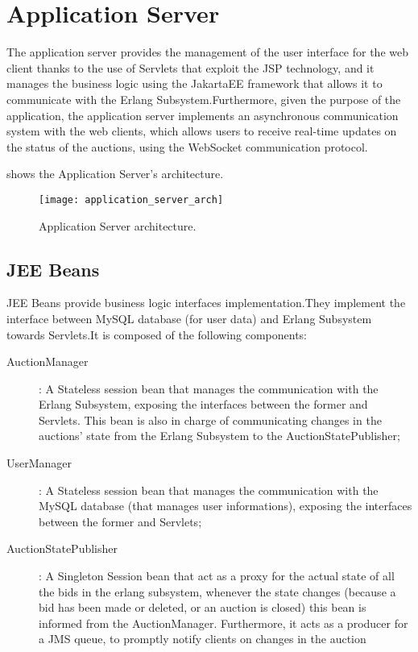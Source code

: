 \section{Application Server}\label{sec:application_server}
The application server provides the management of the user interface for the web
client thanks to the use of Servlets that exploit the JSP technology, and it
manages the business logic using the JakartaEE framework that allows it to
communicate with the Erlang Subsystem.Furthermore, given the purpose of the
application, the application server implements an asynchronous communication
system with the web clients, which allows users to receive real-time updates on
the status of the auctions, using the WebSocket communication protocol.


 shows the Application Server's
architecture.

\begin{figure}[h]
	\centering
	\texttt{[image: application\_server\_arch]}
	\caption{Application Server
	architecture.}\label{fig:application_server_arch}
\end{figure}

\subsection{JEE Beans}

JEE Beans provide business logic interfaces implementation.They implement the
interface between MySQL database (for user data) and Erlang Subsystem towards
Servlets.It is composed of the following components:

\begin{description}
    \item [AuctionManager]: A Stateless session bean that manages the
	    communication with the Erlang Subsystem, exposing the interfaces
	    between the former and Servlets. This bean is also in charge of
	    communicating changes in the auctions’ state from the Erlang
	    Subsystem to the AuctionStatePublisher;
    \item [UserManager]: A Stateless session bean that manages the communication
	    with the MySQL database (that manages user informations), exposing
	    the interfaces between the former and Servlets;
    \item [AuctionStatePublisher]: A Singleton Session bean that act as a proxy
	    for the actual state of all the bids in the erlang subsystem,
	    whenever the state changes (because a bid has been made or deleted,
	    or an auction is closed) this bean is informed from the
	    AuctionManager. Furthermore, it acts as a producer for a JMS queue,
	    to promptly notify clients on changes in the auction
\end{description}


